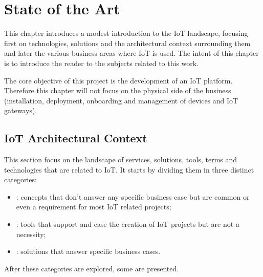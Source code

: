 \chapter{State of the Art}
\label{chap:stateofart}

This chapter introduces a modest introduction to the \gls{IoT} landscape, focusing first on technologies, solutions and the architectural context surrounding them and later the various business areas where \gls{IoT} is used.
The intent of this chapter is to introduce the reader to the subjects related to this work.

The core objective of this project is the development of an \gls{IoT} platform. Therefore this chapter will not focus on the physical side of the business (installation, deployment, onboarding and management of devices and \gls{IoT} gateways). 


\section{IoT Architectural Context}
\label{sec:stateofart:arch}

This section focus on the landscape of services, solutions, tools, terms and technologies that are related to \gls{IoT}.
It starts by dividing them in three distinct categories:

\begin{itemize}
    \item {}: concepts that don't answer any specific business case but are common or even a requirement for most \gls{IoT} related projects; 
    \item {}: tools that support and ease the creation of \gls{IoT} projects but are not a necessity;
    \item {}: solutions that answer specific business cases.
\end{itemize}

After these categories are explored, some  are presented.

